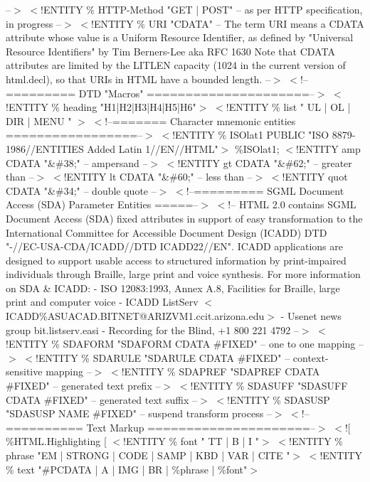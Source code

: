         --$>$
$<$!ENTITY \% HTTP-Method "GET | POST"
        -- as per HTTP specification, in progress
        --$>$
$<$!ENTITY \% URI "CDATA"
        -- The term URI means a CDATA attribute
           whose value is a Uniform Resource Identifier,
           as defined by         
"Universal Resource Identifiers" by Tim Berners-Lee        
aka RFC 1630        
Note that CDATA attributes are limited by the LITLEN        
capacity (1024 in the current version of html.decl),        
so that URIs in HTML have a bounded length.
        --$>$
$<$!--========= DTD "Macros" =====================--$>$
$<$!ENTITY \% heading "H1|H2|H3|H4|H5|H6"$>$
$<$!ENTITY \% list " UL | OL | DIR | MENU " $>$
$<$!--======= Character mnemonic entities =================--$>$
$<$!ENTITY \% ISOlat1 PUBLIC
  "ISO 8879-1986//ENTITIES Added Latin 1//EN//HTML"$>$
\%ISOlat1;
$<$!ENTITY amp CDATA "\&\#38;"     -- ampersand          --$>$
$<$!ENTITY gt CDATA "\&\#62;"      -- greater than       --$>$
$<$!ENTITY lt CDATA "\&\#60;"      -- less than          --$>$
$<$!ENTITY quot CDATA "\&\#34;"    -- double quote       --$>$
$<$!--========= SGML Document Access (SDA) Parameter Entities =====--$>$
$<$!-- HTML 2.0 contains SGML Document Access (SDA) fixed attributes
in support of easy transformation to the International Committee
for Accessible Document Design (ICADD) DTD        
 "-//EC-USA-CDA/ICADD//DTD ICADD22//EN".
ICADD applications are designed to support usable access to
structured information by print-impaired individuals through
Braille, large print and voice synthesis.  For more information on
SDA \& ICADD:  
        - ISO 12083:1993, Annex A.8, Facilities for Braille,        
  large print and computer voice
        - ICADD ListServ        
  $<$ICADD\%ASUACAD.BITNET@ARIZVM1.ccit.arizona.edu$>$
        - Usenet news group bit.listserv.easi
        - Recording for the Blind, +1 800 221 4792
--$>$
$<$!ENTITY \% SDAFORM  "SDAFORM  CDATA  \#FIXED"        
  -- one to one mapping        --$>$
$<$!ENTITY \% SDARULE  "SDARULE  CDATA  \#FIXED"        
  -- context-sensitive mapping --$>$
$<$!ENTITY \% SDAPREF  "SDAPREF  CDATA  \#FIXED"        
  -- generated text prefix     --$>$
$<$!ENTITY \% SDASUFF  "SDASUFF  CDATA  \#FIXED"        
  -- generated text suffix     --$>$
$<$!ENTITY \% SDASUSP  "SDASUSP  NAME   \#FIXED"        
  -- suspend transform process --$>$
$<$!--========== Text Markup =====================--$>$
$<$![ \%HTML.Highlighting [
$<$!ENTITY \% font " TT | B | I "$>$
$<$!ENTITY \% phrase "EM | STRONG | CODE | SAMP | KBD | VAR | CITE "$>$
$<$!ENTITY \% text "\#PCDATA | A | IMG | BR | \%phrase | \%font"$>$
